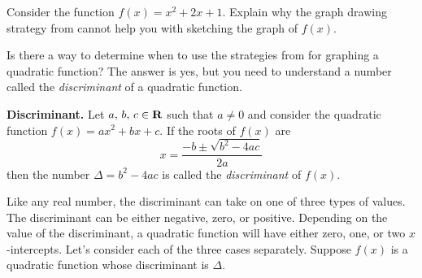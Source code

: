 \documentclass[a4paper,oneside,12pt]{article}
\begin{document}
\begin{exercise}
Consider the function $f(x) = x^2 + 2x + 1$.  Explain why the graph
drawing strategy from  cannot help you
with sketching the graph of $f(x)$.
\end{exercise}

Is there a way to determine when to use the strategies
from  for graphing a
quadratic function?  The answer is yes, but you need to understand a
number called the \emph{discriminant} of a quadratic function.

\begin{definition}
\textbf{Discriminant.}
Let ${a},\, {b},\, {c} \in \mathbf{R}$ such that $a \neq 0$ and consider the
quadratic function $f(x) = ax^2 + bx + c$.  If the roots of $f(x)$ are
\[
x
=
\frac{
  -b \pm \sqrt{b^2 - 4ac}
}{
  2a
}
\]
then the number $\Delta = b^2 - 4ac$ is called the \emph{discriminant}
of $f(x)$.
\end{definition}

Like any real number, the discriminant can take on one of three types
of values.  The discriminant can be either negative, zero, or
positive.  Depending on the value of the discriminant, a quadratic
function will have either zero, one, or two $x$-intercepts.  Let's
consider each of the three cases separately.  Suppose $f(x)$ is a
quadratic function whose discriminant is $\Delta$.
\end{document}

